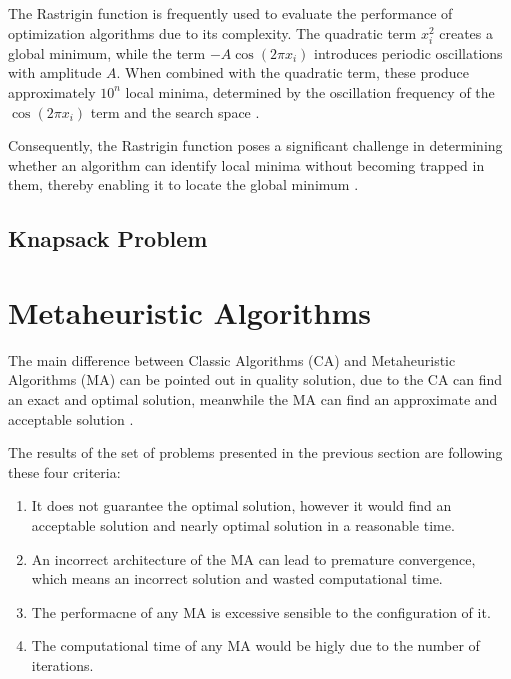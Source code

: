     The Rastrigin function is frequently used to evaluate the performance of optimization
    algorithms due to its complexity. The quadratic term $x_i^2$ creates a global minimum,
    while the term $-A\cos(2\pi x_i)$ introduces periodic oscillations with amplitude $A$.
    When combined with the quadratic term, these produce approximately $10^n$ local minima,
    determined by the oscillation frequency of the $\cos(2\pi x_i)$ term and the 
    search space \cite{omeradzic2022progress}.

    Consequently, the Rastrigin function poses a significant challenge in determining 
    whether an algorithm can identify local minima without becoming trapped in them, 
    thereby enabling it to locate the global minimum \cite{benhamou2019bcma}.


  \subsection*{Knapsack Problem} \blindtext





\section*{Metaheuristic Algorithms}

  The main difference between Classic Algorithms (CA) and Metaheuristic Algorithms (MA) 
  can be pointed out in quality solution, due to the CA can find an exact and optimal solution, 
  meanwhile the MA can find an approximate and acceptable solution \cite{almufti2017using}.
  
  The results of the set of problems presented in the previous section are following these
  four criteria:

  \begin{enumerate}
    \item It does not guarantee the optimal solution, however it would find an acceptable
      solution and nearly optimal solution in a reasonable time.
    \item An incorrect architecture of the MA can lead to premature convergence, which 
      means an incorrect solution and wasted computational time.
    \item The performacne of any MA is excessive sensible to the configuration of it.
    \item The computational time of any MA would be higly due to the number of iterations.  
  \end{enumerate}

